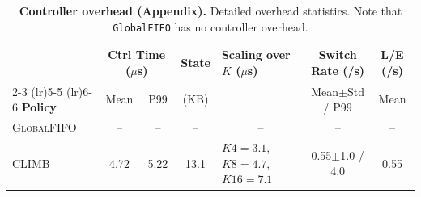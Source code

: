 \begin{table}[t]
  \centering
  \small
  \caption{\textbf{Controller overhead (Appendix).} Detailed overhead statistics. Note that \texttt{GlobalFIFO} has no controller overhead.}
  \label{tab:overhead_ext}
  \setlength{\tabcolsep}{6pt} %
  \begin{tabular}{l cc c l c c}
    \toprule
    & \multicolumn{2}{c}{\textbf{Ctrl Time ($\mu$s)}} & \textbf{State} & \textbf{Scaling over $K$ ($\mu$s)} & \textbf{Switch Rate (/s)} & \textbf{L/E (/s)} \\
    \cmidrule(lr){2-3} \cmidrule(lr){5-5} \cmidrule(lr){6-6} 
    \textbf{Policy} & Mean & P99 & (KB) & & Mean$\pm$Std / P99 & Mean \\
    \midrule
    \textsc{GlobalFIFO} & -- & -- & -- & \multicolumn{1}{c}{--} & -- & -- \\
    \textsc{CLIMB} & 4.72 & 5.22 & 13.1 & 
    $K4{=}3.1$, $K8{=}4.7$, $K16{=}7.1$ & 
    0.55$\pm$1.0 / 4.0 & 0.55 \\
    \bottomrule
  \end{tabular}
\end{table}
